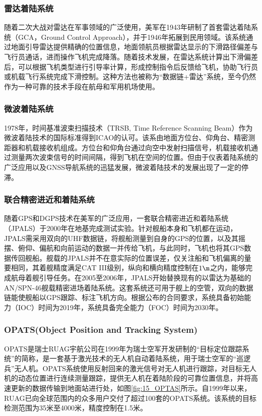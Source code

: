\subsubsection{雷达着陆系统}
随着二次大战对雷达在军事领域的广泛使用，美军在1943年研制了首套雷达着陆系统（GCA，Ground Control Approach），并于1946年拓展到民用领域。该系统通过地面引导雷达提供精确的位置信息，地面领航员根据雷达显示的下滑路径偏差与飞行员通话，进而操作飞机完成降落。随着技术发展，在雷达系统计算出下滑偏差后，可以根据飞机类型进行引导率计算，形成控制指令后反馈给飞机，协助飞行员或机载飞行系统完成下滑控制。这种方法也被称为“数据链+雷达”系统，至今仍然作为一种可靠的技术手段在航母和军用机场使用。

\subsubsection{微波着陆系统}
1978年，时间基准波束扫描技术（TRSB, Time Reference Scanning Beam）作为微波着陆技术的国际标准得到ICAO的认可。该系由地面方位台、仰角台、精密测距器和机载接收机组成。方位台和仰角台通过向空中发射扫描信号，机载接收机通过测量两次波束信号的时间间隔，得到飞机在空间的位置。但由于仪表着陆系统的广泛应用以及GNSS导航系统的迅猛发展，微波着陆技术的发展出现了一定的停滞。

\subsubsection{联合精密进近和着陆系统}
随着GPS和DGPS技术在美军的广泛应用，一套联合精密进近和着陆系统（JPALS）于2000年在地基完成测试实验。针对舰船本身和飞机都在运动，JPALS需采用双向的UHF数据链，将舰船测量到自身的GPS的位置，以及其摇摆、俯仰、偏航和向前运动的数据一并传给飞机，与此同时，飞机也将其GPS数据传回舰船。舰载的JPALS并不在意实际的位置误差，仅关注船和飞机偏离的量要相同，其着舰精度满足CAT III级别，纵向和横向精度控制在$1 \m$之内，能够完成航母着舰引导任务。在2005至2006年，JPALS开始替换现有的以雷达为基础的AN/SPN-46舰载精密进场着陆系统。这套系统还可用于舰上的空管，双向的数据链能使舰船以GPS跟踪、标注飞机方向。根据公布的合同要求，系统具备初始能力（IOC）时间为2019年，系统具备完全能力（FOC）时间为2030年。


\subsubsection{OPATS(Object Position and Tracking System)}
OPATS是瑞士RUAG宇航公司在1999年为瑞士空军开发研制的“目标定位跟踪系统”的简称，是一套基于激光技术的无人机自动着陆系统，用于瑞士空军的“巡逻兵”无人机。OPATS系统使用反射回来的激光信号对无人机进行跟踪，对目标无人机的动态位置进行连续测量跟踪，提供无人机在着陆阶段的可靠位置信息，并将高速更新的数据传输到地面站进行处，如图\ref{fig:15_OPTAS}所示。自1999年以来，RUAG已向全球范围内的众多用户交付了超过100套的OPATS系统。该系统的目标检测范围为35米至4000米，精度控制在1.5米。

